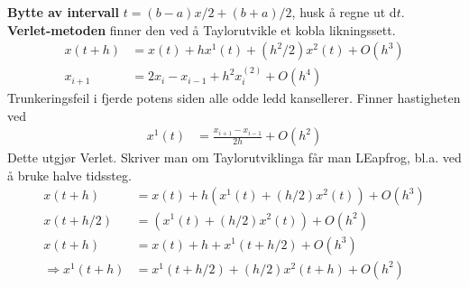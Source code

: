 \documentclass[12pt,a4paper,twocolumn]{article}
\begin{document}
\begin{flushleft}
\textbf{Bytte av intervall} $t = (b-a)x/2 + (b+a)/2$, husk å regne ut d$t$.\\
\textbf{Verlet-metoden} finner den ved å Taylorutvikle et kobla likningssett.
\begin{align*} 
x(t+h)&=x(t)+hx^1(t)+(h^2/2)x^2(t)+O(h^3) \\
x_{i+1}&= 2x_i-x_{i-1}+h^2x^{(2)}_i+O(h^4)
\end{align*}
Trunkeringsfeil i fjerde potens siden alle odde ledd kansellerer. Finner hastigheten ved
\begin{align*}
  x^1(t)&= \frac{x_{i+1}-x_{i-1}}{2h} + O(h^2)
\end{align*}
Dette utgjør Verlet. Skriver man om Taylorutviklinga får man LEapfrog, bl.a. ved å bruke halve tidssteg.
\begin{align*}
  x(t+h) &= x(t)+h(x^1(t)+(h/2)x^2(t))+O(h^3) \\
  x(t+h/2) &= (x^1(t)+(h/2)x^2(t))+O(h^2) \\
   x(t+h) &= x(t)+h+x^1(t+h/2)+O(h^3)\\
   \Rightarrow x^1(t+h) &= x^1(t+h/2) + (h/2)x^2(t+h)+O(h^2)
\end{align*}


\end{flushleft}
\end{document}
